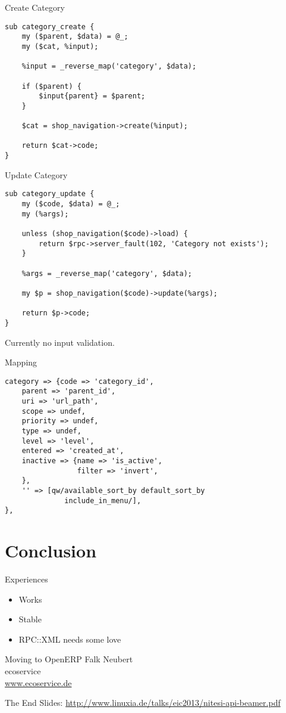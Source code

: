 \begin{frame}[fragile]{Create Category}
\begin{lstlisting}
sub category_create {
    my ($parent, $data) = @_;
    my ($cat, %input);

    %input = _reverse_map('category', $data);

    if ($parent) {
        $input{parent} = $parent;
    }

    $cat = shop_navigation->create(%input);

    return $cat->code;
}
\end{lstlisting}
\end{frame}

\begin{frame}[fragile]{Update Category}
\begin{lstlisting}
sub category_update {
    my ($code, $data) = @_;
    my (%args);

    unless (shop_navigation($code)->load) {
        return $rpc->server_fault(102, 'Category not exists');
    }

    %args = _reverse_map('category', $data);

    my $p = shop_navigation($code)->update(%args);

    return $p->code;
}
\end{lstlisting}
\end{frame}

Currently no input validation.

\begin{frame}[fragile]{Mapping}
\begin{lstlisting}
category => {code => 'category_id',
    parent => 'parent_id',
    uri => 'url_path',
    scope => undef,
    priority => undef,
    type => undef,
    level => 'level',
    entered => 'created_at',
    inactive => {name => 'is_active',
                 filter => 'invert',
    },
    '' => [qw/available_sort_by default_sort_by 
              include_in_menu/],
},
\end{lstlisting}
\end{frame}

\section{Conclusion}

\begin{frame}{Experiences}
\begin{itemize}
\item Works
\item Stable
\item RPC::XML needs some love
\end{itemize}
\end{frame}

\begin{frame}{Moving to OpenERP}
Falk Neubert \\
ecoservice \\
\url{www.ecoservice.de}
\end{frame}

\begin{frame}{The End}
Slides:
\url{http://www.linuxia.de/talks/eic2013/nitesi-api-beamer.pdf}
\end{frame}



